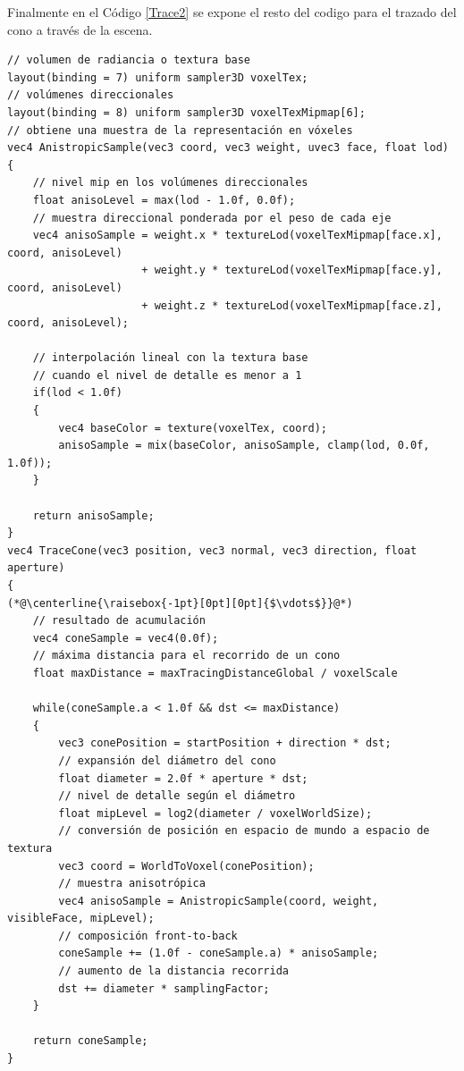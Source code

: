 Finalmente en el Código \ref{Trace2} se expone el resto del codigo para el trazado del cono a través de la escena.
\\
\begin{lstlisting}[caption={Trazado de cono con vóxeles.}, label=Trace2]
// volumen de radiancia o textura base
layout(binding = 7) uniform sampler3D voxelTex;
// volúmenes direccionales
layout(binding = 8) uniform sampler3D voxelTexMipmap[6];
// obtiene una muestra de la representación en vóxeles
vec4 AnistropicSample(vec3 coord, vec3 weight, uvec3 face, float lod)
{
    // nivel mip en los volúmenes direccionales
    float anisoLevel = max(lod - 1.0f, 0.0f);
    // muestra direccional ponderada por el peso de cada eje
    vec4 anisoSample = weight.x * textureLod(voxelTexMipmap[face.x], coord, anisoLevel)
                     + weight.y * textureLod(voxelTexMipmap[face.y], coord, anisoLevel)
                     + weight.z * textureLod(voxelTexMipmap[face.z], coord, anisoLevel);

    // interpolación lineal con la textura base 
    // cuando el nivel de detalle es menor a 1
    if(lod < 1.0f)
    {
        vec4 baseColor = texture(voxelTex, coord);
        anisoSample = mix(baseColor, anisoSample, clamp(lod, 0.0f, 1.0f));
    }

    return anisoSample;                    
}
vec4 TraceCone(vec3 position, vec3 normal, vec3 direction, float aperture)
{
(*@\centerline{\raisebox{-1pt}[0pt][0pt]{$\vdots$}}@*)
    // resultado de acumulación
    vec4 coneSample = vec4(0.0f);
    // máxima distancia para el recorrido de un cono
    float maxDistance = maxTracingDistanceGlobal / voxelScale

    while(coneSample.a < 1.0f && dst <= maxDistance)
    {
        vec3 conePosition = startPosition + direction * dst;
        // expansión del diámetro del cono
        float diameter = 2.0f * aperture * dst;
        // nivel de detalle según el diámetro
        float mipLevel = log2(diameter / voxelWorldSize);
        // conversión de posición en espacio de mundo a espacio de textura
        vec3 coord = WorldToVoxel(conePosition);
        // muestra anisotrópica
        vec4 anisoSample = AnistropicSample(coord, weight, visibleFace, mipLevel);
        // composición front-to-back
        coneSample += (1.0f - coneSample.a) * anisoSample;
        // aumento de la distancia recorrida
        dst += diameter * samplingFactor;
    }

    return coneSample;
}
\end{lstlisting}

